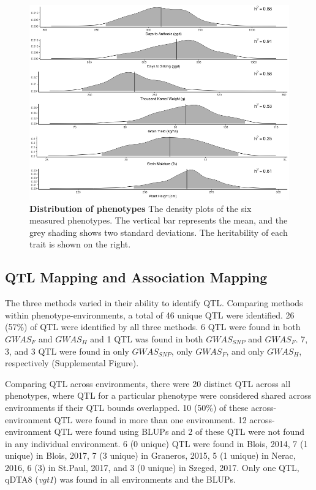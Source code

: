 \documentclass[article,9pt,twocolumn,twoside]{rilabRxiv}
\begin{document}
\begin{figure}[ht]
\centering
\includegraphics[width=\linewidth]{figures/Methods_Fig2.png}
\caption{\textbf{Distribution of phenotypes} The density plots of the six measured phenotypes. The vertical bar represents the mean, and the grey shading shows two standard deviations. The heritability of each trait is shown on the right.}
\label{fig:figure2}
\end{figure}

\subsection{QTL Mapping and Association Mapping}
The three methods varied in their ability to identify QTL.
Comparing methods within phenotype-environments, a total of 46 unique QTL were identified. 26 (57\%) of QTL were identified by all three methods. 6 QTL were found in both $GWAS_F$ and $GWAS_H$ and 1 QTL was found in both $GWAS_{SNP}$ and $GWAS_F$. 7, 3, and 3 QTL were found in only $GWAS_{SNP}$, only $GWAS_F$, and only $GWAS_H$, respectively (Supplemental Figure).

Comparing QTL across environments, there were 20 distinct QTL across all phenotypes, where QTL for a particular phenotype were considered shared across environments if their QTL bounds overlapped. 10 (50\%) of these across-environment QTL were found in more than one environment. 12 across-environment QTL were found using BLUPs and 2 of these QTL were not found in any individual environment. 6 (0 unique) QTL were found in Blois, 2014, 7 (1 unique) in Blois, 2017, 7 (3 unique) in Graneros, 2015, 5 (1 unique) in Nerac, 2016, 6 (3) in St.Paul, 2017, and 3 (0 unique) in Szeged, 2017. Only one QTL, qDTA8 (\emph{vgt1}) was found in all environments and the BLUPs.
\end{document}
